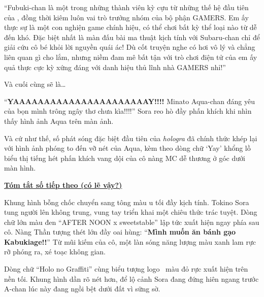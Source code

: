 \documentclass[../main.tex]{subfiles}
\begin{document}

``Fubuki-chan là một trong những thành viên kỳ cựu từ những thế hệ đầu tiên của \hll, đồng thời kiêm luôn vai trò trưởng nhóm của bộ phận GAMERS. Em ấy thực sự là một con nghiện game chính hiệu, có thể chơi bất kỳ thể loại nào từ dễ đến khó. Đặc biệt nhất là màn đấu bài ma thuật kịch tính với Subaru-chan chỉ để giải cứu cô bé khỏi lời nguyền quái ác! Dù cốt truyện nghe có hơi vô lý và chẳng liên quan gì cho lắm, nhưng niềm đam mê bất tận với trò chơi điện tử của em ấy quả thực cực kỳ xứng đáng với danh hiệu thủ lĩnh nhà GAMERS nhỉ!''

\il

Và cuối cùng sẽ là\dots

{\color{gold} }



``\textbf{\Large{YAAAAAAAAAAAAAAAAAAAAAAY!!!!}} Minato Aqua-chan đáng yêu của bọn mình trông ngây thơ chưa kìa!!!!'' Sora reo hò đầy phấn khích khi nhìn thấy hình ảnh Aqua trên màn ảnh.

\pov{-}

Và cứ như thế, số phát sóng đặc biệt đầu tiên của \textit{hologra} đã chính thức khép lại với hình ảnh phóng to đến vỡ nét của Aqua, kèm theo dòng chữ `Yay' khổng lồ biểu thị tiếng hét phấn khích vang dội của cô nàng MC dễ thương ở góc dưới màn hình.

\omk

\begin{center}
  \textbf{\uline{Tóm tắt số tiếp theo (có lẽ vậy?)}}
\end{center}

Khung hình bỗng chốc chuyển sang tông màu u tối đầy kịch tính. Tokino Sora tung người lên không trung, vung tay triển khai một chiêu thức trác tuyệt. Dòng chữ lớn màu đen ``AFTER NOON x sweetstable'' lập tức xuất hiện ngay phía sau cô. Nàng Thần tượng thét lớn đầy oai hùng: ``\textbf{Mình muốn ăn bánh gạo Kabukiage!!}'' Từ mũi kiếm của cô, một làn sóng năng lượng màu xanh lam rực rỡ phóng ra, xé toạc không gian.


Dòng chữ ``Holo no Graffiti'' cùng biểu tượng logo \hll\ màu đỏ rực xuất hiện trên nền tối. Khung hình dần rõ nét hơn, để lộ cảnh Sora đang đứng hiên ngang trước A-chan lúc này đang ngồi bệt dưới đất vì sững sờ.
\end{document}
